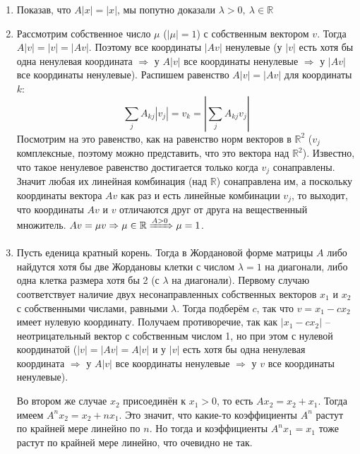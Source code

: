 \begin{enumerate}
  	\item Показав, что $ A|x| = |x| $, мы попутно доказали $ \lambda > 0,\ \lambda \in \mathbb{R} $
  	\item Рассмотрим собственное число $ \mu $ ($ |\mu| = 1 $) с собственным вектором $ v $. Тогда $ A|v|=|v|=|Av| $. Поэтому все координаты $ |Av| $ ненулевые (у $ |v| $ есть хотя бы одна ненулевая координата $ \Rightarrow $ у $ A|v| $ все координаты ненулевые $ \Rightarrow $ у $ |Av| $ все координаты ненулевые). Распишем равенство $ A|v| = |Av| $ для координаты $ k $: 
  	$$ \sum\limits_{j} A_{kj} |v_j| = v_k = |\sum\limits_{j} A_{kj} v_j| $$
  	Посмотрим на это равенство, как на равенство норм векторов в $ \mathbb{R}^2 $ ($ v_j $ комплексные, поэтому можно представить, что это вектора над $ \mathbb{R}^2 $). Известно, что такое ненулевое равенство достигается только когда $ v_j $ сонаправлены. Значит любая их линейная комбинация (над $ \mathbb{R} $) сонаправлена им, а поскольку координаты вектора $ Av $ как раз и есть линейные комбинации $ v_j $, то выходит, что координаты $ Av $ и $ v $ отличаются друг от друга на вещественный множитель. $ Av = \mu v \Rightarrow \mu \in \mathbb{R} \xRightarrow{A > 0} \mu = 1 $.
  	\item Пусть еденица кратный корень. Тогда в Жордановой форме матрицы $ A $ либо найдутся хотя бы две Жордановы клетки с числом $ \lambda = 1 $ на диагонали, либо одна клетка размера хотя бы 2 (с $ \lambda $ на диагонали). Первому случаю соответствует наличие двух несонаправленных собственных векторов $ x_1 $ и $ x_2 $ с собственными числами, равными $\lambda$. Тогда подберём $ c $, так что $ v = x_1 - c x_2 $ имеет нулевую координату. Получаем противоречие, так как $|x_1 - c x_2|$ -- неотрицательный вектор с собственным числом 1, но при этом с нулевой координатой ($ |v| = |Av| = A|v|$ и у $ |v| $ есть хотя бы одна ненулевая координата $ \Rightarrow $ у $ A|v| $ все координаты ненулевые $ \Rightarrow $ у $ v $ все координаты ненулевые).

  	Во втором же случае $ x_2 $ присоединён к $ x_1 > 0 $, то есть $ A x_2 = x_2 + x_1 $. Тогда имеем $ A^n x_2 = x_2 + n x_1 $. Это значит, что какие-то коэффициенты $ A^n $ растут по крайней мере линейно по $ n $. Но тогда и коэффициенты $ A^n x_1 = x_1 $ тоже растут по крайней мере линейно, что очевидно не так.
  \end{enumerate}
\endproof
